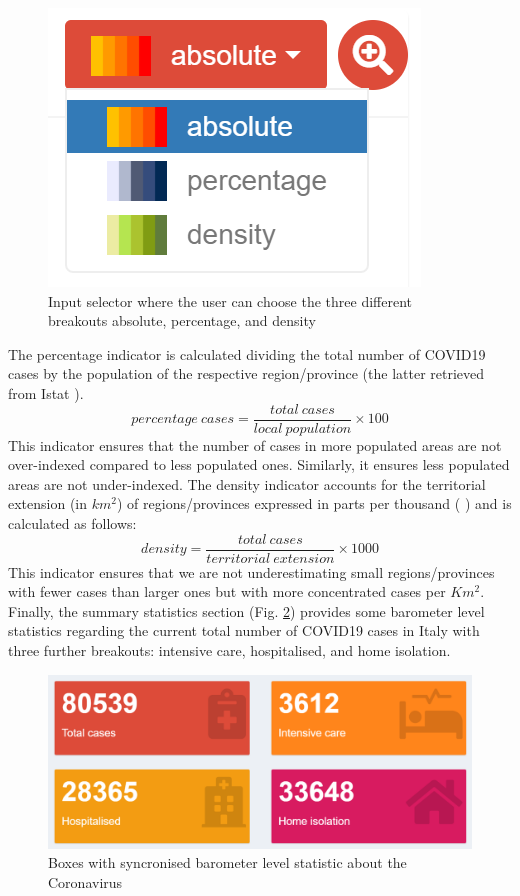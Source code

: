 \documentclass[
12pt, %
a4paper, %
oneside, %
headinclude,footinclude, %
BCOR5mm, %
]{scrartcl}
\begin{document}
\begin{figure}[h]
 \centering
 \includegraphics[width=0.5\linewidth]{Figures/Home_figure_2.png} 
 \caption{Input selector where the user can choose the three different breakouts absolute, percentage, and density}
 \label{Home_fig2}
\end{figure}

The percentage indicator is calculated dividing the total number of COVID19 cases by the population of the respective region/province (the latter retrieved from Istat \cite{Istat+res0,Istat+res1}).
\begin{equation}
percentage~cases = \frac{total~cases}{local~population} \times 100
\end{equation}
This indicator ensures that the number of cases in more populated areas are not over-indexed compared to less populated ones. Similarly, it ensures less populated areas are not under-indexed. The density  indicator accounts for the territorial extension (in $km^2$) of regions/provinces expressed in parts per thousand (  \textperthousand ) and is calculated as follows:
\begin{equation}
density =  \dfrac{total~cases}{territorial~extension}\times 1000
\end{equation}
This indicator ensures that we are not underestimating small regions/provinces with fewer cases than larger ones but with more concentrated cases per $Km^2$. Finally, the summary statistics section (Fig. \ref{Home_fig3}) provides some barometer level statistics regarding the current total number of COVID19 cases in Italy with three further breakouts: intensive care, hospitalised, and home isolation.

\begin{figure}[h]
 \centering
 \includegraphics[width=0.5\linewidth]{Figures/Home_figure_3.png} 
 \caption{Boxes with syncronised barometer level statistic about the Coronavirus}
 \label{Home_fig3}
\end{figure}
\end{document}
